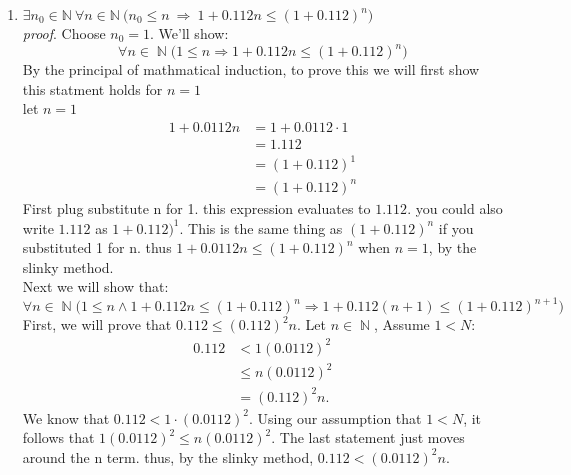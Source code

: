 \documentclass[11pt]{article}
\numberwithin{equation}{section}
\DeclareMathOperator*{\+}{\oplus}
\DeclareMathOperator*{\N}{\mathbb{N}}
\begin{document}
\begin{enumerate}[label= 2.\arabic*), itemsep=0.4cm]
\newpage
  \item %
    $\exists n_0 \in \mathbb{N} \ \forall n \in \mathbb{N} \ \Big (n_0 \leq n \ \Rightarrow \ 1+0.112n \leq (1+ 0.112)^n \Big )$\\
    \textit{proof}. Choose $n_0 = 1$. We'll show:
    $$\forall n \in \N \Big(1 \leq n \Rightarrow 1+0.112n \leq (1+ 0.112)^n\Big)$$
    By the principal of mathmatical induction, to prove this we will first show this statment holds for $n = 1$\\ let $n = 1$
    \begin{align*}
      1 + 0.0112n &= 1+0.0112\cdot 1\\
                  &= 1.112\\
                  &= (1+0.112)^1\\
                  &= (1+0.112)^n
    \end{align*}
    First plug substitute n for 1. this expression evaluates to $1.112$. you could also write $1.112$ as $1+0.112)^1$. This is the same thing as $(1+0.112)^n$ if you substituted 1 for n. thus $1+0.0112n \leq (1+0.112)^n$ when $n=1$, by the slinky method.\\
    Next we will show that:
    $$\forall n \in \N \Big(1 \leq n \land 1+0.112n \leq (1+ 0.112)^n \Rightarrow  1+0.112(n+1) \leq (1+ 0.112)^{n+1}\Big)$$
    First, we will prove that $0.112 \leq (0.112)^2n$. Let $n \in \N$, Assume $1 < N$:
    \begin{align*}
      0.112 &< 1(0.0112)^2 \\
            &\leq n(0.0112)^2 \\
            &= (0.112)^2n.
    \end{align*}
   We know that $0.112 < 1\cdot(0.0112)^2$. Using our assumption that $1 < N$, it follows that $1(0.0112)^2 \leq n(0.0112)^2$. The last statement just moves around the n term. thus, by the slinky method, $0.112 < (0.0112)^2n$.


\end{enumerate}
\end{document}
